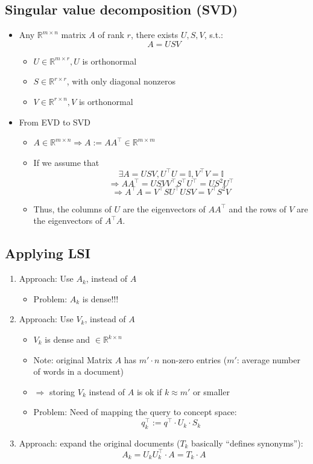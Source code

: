 \documentclass[a4paper]{scrartcl}
\newcommand{\blu}[1]{\textcolor{mainblue}{#1}}
\begin{document}
\subsection{Singular value decomposition (SVD)}
\label{sec:svd}
\begin{itemize}
\item Any $\mathbb{R}^{m\times n}$ matrix $A$ of rank $r$, there exists $U,S,V$, s.t.:
  \[A=USV\]
  \begin{itemize}
  \item $U\in \mathbb{R}^{m\times r}, U$ is orthonormal
  \item $S \in \mathbb{R}^{r\times r}$, with only diagonal nonzeros
  \item $V\in \mathbb{R}^{r\times n}, V$ is orthonormal
  \end{itemize}
\item From EVD to SVD
  \begin{itemize}
  \item $A\in \mathbb{R}^{m\times n}\Rightarrow A:=AA^\top \in
    \mathbb{R}^{m\times m}$
  \item If we assume that
    \[\exists A=USV, U^\top U=\mathbb{I}, V^\top V=\mathbb{I}\]
    \[\Rightarrow AA^\top = USVV^\top S^\top U^\top=US^2U^\top\]
    \[\Rightarrow A^\top A= V^\top SU^\top USV=V^\top S^2 V\]
  \item Thus, the \blu{columns of $U$} are the eigenvectors of $AA^\top$ and the
    \blu{rows of $V$} are the eigenvectors of $A^\top A$.
  \end{itemize}
\end{itemize}

\subsection{Applying LSI}
\begin{enumerate}
\item Approach: Use $A_k$, instead of $A$
  \begin{itemize}
  \item Problem: $A_k$ is \blu{dense!!!}
  \end{itemize}
\item Approach: Use $V_k$, instead of $A$
  \begin{itemize}
  \item $V_k$ is dense and $\in\mathbb{R}^{k\times n}$
  \item Note: original Matrix $A$ has $m'\cdot n$ non-zero entries ($m'$:
    average number of words in a document)
  \item $\Rightarrow$ storing $V_k$ instead of $A$ is ok if $k\approx m'$ or
    smaller
  \item Problem: Need of mapping the query to concept space:
    \[q^\top_k := q^\top\cdot U_k\cdot S_k\]
  \end{itemize}
\item Approach: expand the original documents ($T_k$ basically ``defines synonyms''):
  \[A_k=U_kU_k^\top\cdot A=T_k\cdot A\]
\end{enumerate}
\end{document}
